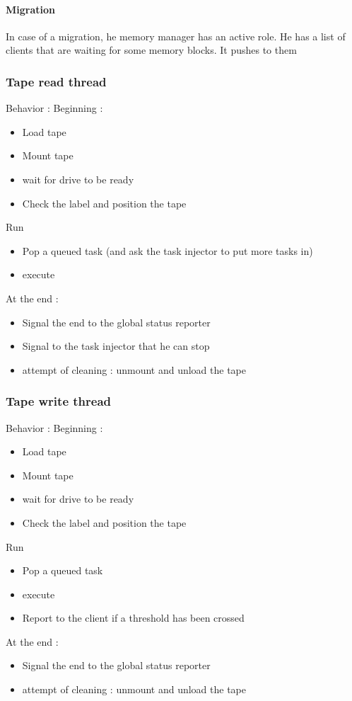 \paragraph{Migration}
In case of a migration, he memory manager has an active role. 
He has a list of clients that are waiting for some memory blocks. It pushes to them  


\subsubsection{Tape read thread}
Behavior :
Beginning : 
\begin{itemize}[noitemsep]
\item Load tape
\item Mount tape
\item wait for drive to be ready
\item Check the label and position the tape 
\end{itemize}
Run 
\begin{itemize}[noitemsep]
\item Pop a queued task (and ask the task injector to put more tasks in) 
\item execute 
\end{itemize}
At the end :
\begin{itemize}[noitemsep]
\item Signal the end to the global status reporter
\item Signal to the task injector that he can stop 
\item attempt of cleaning : unmount and unload the tape
\end{itemize}
\subsubsection{Tape write thread}
Behavior :
Beginning : 
\begin{itemize}[noitemsep]
\item Load tape
\item Mount tape
\item wait for drive to be ready
\item Check the label and position the tape 
\end{itemize}
Run 
\begin{itemize}[noitemsep]
\item Pop a queued task 
\item execute 
\item Report to the client if a threshold has been crossed
\end{itemize}
At the end :
\begin{itemize}[noitemsep]
\item Signal the end to the global status reporter
\item attempt of cleaning : unmount and unload the tape
\end{itemize}
